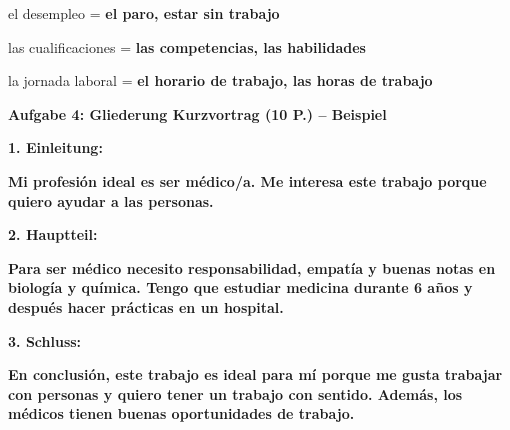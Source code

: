 \documentclass[11pt,a4paper]{article}
\newcommand{\lsg}[1]{\textcolor{loesung}{\textbf{#1}}}
\begin{document}
\begin{gruppeBbox}
el desempleo = \lsg{el paro, estar sin trabajo}

las cualificaciones = \lsg{las competencias, las habilidades}

la jornada laboral = \lsg{el horario de trabajo, las horas de trabajo}

\vspace{0.5em}

\textbf{Aufgabe 4: Gliederung Kurzvortrag (10 P.) -- Beispiel}

\textbf{1. Einleitung:}

\lsg{Mi profesión ideal es ser médico/a. Me interesa este trabajo porque quiero ayudar a las personas.}

\textbf{2. Hauptteil:}

\lsg{Para ser médico necesito responsabilidad, empatía y buenas notas en biología y química. Tengo que estudiar medicina durante 6 años y después hacer prácticas en un hospital.}

\textbf{3. Schluss:}

\lsg{En conclusión, este trabajo es ideal para mí porque me gusta trabajar con personas y quiero tener un trabajo con sentido. Además, los médicos tienen buenas oportunidades de trabajo.}

\end{gruppeBbox}
\end{document}

